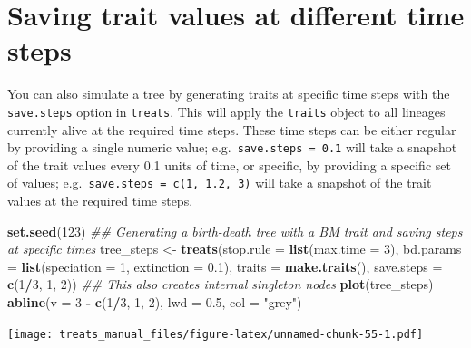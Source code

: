 \documentclass[
]{book}
\newenvironment{Shaded}{\begin{snugshade}}{\end{snugshade}}
\newcommand{\CommentTok}[1]{\textcolor[rgb]{0.56,0.35,0.01}{\textit{#1}}}
\newcommand{\DataTypeTok}[1]{\textcolor[rgb]{0.13,0.29,0.53}{#1}}
\newcommand{\DecValTok}[1]{\textcolor[rgb]{0.00,0.00,0.81}{#1}}
\newcommand{\FloatTok}[1]{\textcolor[rgb]{0.00,0.00,0.81}{#1}}
\newcommand{\KeywordTok}[1]{\textcolor[rgb]{0.13,0.29,0.53}{\textbf{#1}}}
\newcommand{\NormalTok}[1]{#1}
\newcommand{\OperatorTok}[1]{\textcolor[rgb]{0.81,0.36,0.00}{\textbf{#1}}}
\newcommand{\StringTok}[1]{\textcolor[rgb]{0.31,0.60,0.02}{#1}}
\begin{document}
\hypertarget{saving-trait-values-at-different-time-steps}{%
\section{Saving trait values at different time steps}\label{saving-trait-values-at-different-time-steps}}

You can also simulate a tree by generating traits at specific time steps with the \texttt{save.steps} option in \texttt{treats}.
This will apply the \texttt{traits} object to all lineages currently alive at the required time steps.
These time steps can be either regular by providing a single numeric value; e.g.~\texttt{save.steps\ =\ 0.1} will take a snapshot of the trait values every 0.1 units of time, or specific, by providing a specific set of values; e.g.~\texttt{save.steps\ =\ c(1,\ 1.2,\ 3)} will take a snapshot of the trait values at the required time steps.

\begin{Shaded}
\begin{Highlighting}[]
\KeywordTok{set.seed}\NormalTok{(}\DecValTok{123}\NormalTok{)}
\CommentTok{\#\# Generating a birth{-}death tree with a BM trait and saving steps at specific times}
\NormalTok{tree\_steps \textless{}{-}}\StringTok{ }\KeywordTok{treats}\NormalTok{(}\DataTypeTok{stop.rule  =} \KeywordTok{list}\NormalTok{(}\DataTypeTok{max.time =} \DecValTok{3}\NormalTok{),}
                     \DataTypeTok{bd.params  =} \KeywordTok{list}\NormalTok{(}\DataTypeTok{speciation =} \DecValTok{1}\NormalTok{, }\DataTypeTok{extinction =} \FloatTok{0.1}\NormalTok{),}
                     \DataTypeTok{traits     =} \KeywordTok{make.traits}\NormalTok{(),}
                     \DataTypeTok{save.steps =} \KeywordTok{c}\NormalTok{(}\DecValTok{1}\OperatorTok{/}\DecValTok{3}\NormalTok{, }\DecValTok{1}\NormalTok{, }\DecValTok{2}\NormalTok{))}
\CommentTok{\#\# This also creates internal singleton nodes}
\KeywordTok{plot}\NormalTok{(tree\_steps)}
\KeywordTok{abline}\NormalTok{(}\DataTypeTok{v =} \DecValTok{3} \OperatorTok{{-}}\StringTok{ }\KeywordTok{c}\NormalTok{(}\DecValTok{1}\OperatorTok{/}\DecValTok{3}\NormalTok{, }\DecValTok{1}\NormalTok{, }\DecValTok{2}\NormalTok{), }\DataTypeTok{lwd =} \FloatTok{0.5}\NormalTok{, }\DataTypeTok{col =} \StringTok{"grey"}\NormalTok{)}
\end{Highlighting}
\end{Shaded}

\texttt{[image: treats\_manual\_files/figure-latex/unnamed-chunk-55-1.pdf]}
\end{document}
